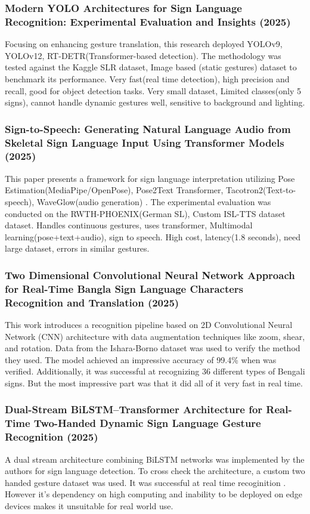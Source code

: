 \subsubsection{Modern YOLO Architectures for Sign Language Recognition: Experimental Evaluation and Insights (2025)}
Focusing on enhancing gesture translation, this research deployed YOLOv9, YOLOv12, RT-DETR(Transformer-based detection). The methodology was tested against the Kaggle SLR dataset, Image based (static gestures) dataset to benchmark its performance. Very fast(real time detection), high precision and recall, good for object detection tasks. Very small dataset, Limited classes(only 5 signs), cannot handle dynamic gestures well, sensitive to background and lighting.\cite{study_yolo_slr_2025}

\subsubsection{Sign-to-Speech: Generating Natural Language Audio from Skeletal Sign Language Input Using Transformer Models (2025)}
This paper presents a framework for sign language interpretation utilizing Pose Estimation(MediaPipe/OpenPose), Pose2Text Transformer, Tacotron2(Text-to-speech), WaveGlow(audio generation) \cite{56, 57}. The experimental evaluation was conducted on the RWTH-PHOENIX(German SL), Custom ISL-TTS dataset dataset. Handles continuous gestures, uses transformer, Multimodal learning(pose+text+audio), sign to speech. High cost, latency(1.8 seconds), need large dataset, errors in similar gestures. \cite{study_sign_to_speech_2025}

\subsubsection{Two Dimensional Convolutional Neural Network Approach for Real-Time Bangla Sign Language Characters Recognition and Translation (2025)} 
This work introduces a recognition pipeline based on 2D Convolutional Neural Network (CNN) architecture with data augmentation techniques like zoom, shear, and rotation. Data from the Ishara-Borno dataset was used to verify the method they used. The model achieved an impressive accuracy of 99.4\% when was verified. Additionally, it was successful at recognizing 36 different types of Bengali signs. But the most impressive part was that it did all of it very fast in real time. \cite{study_2d_cnn_bdsl_2025}

\subsubsection{Dual-Stream BiLSTM–Transformer Architecture for Real-Time Two-Handed Dynamic Sign Language Gesture Recognition (2025)}
A dual stream architecture combining BiLSTM networks was implemented by the authors for sign language detection. To cross check the architecture, a custom two handed gesture dataset was used. It was successful at real time recoginition . However it's dependency on high computing and inability to be deployed on edge devices makes it unsuitable for real world use.\cite{study_dualstream_bilstm_2025}

